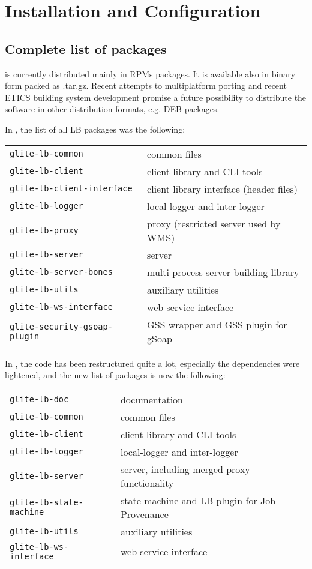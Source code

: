 \section{Installation and Configuration}

\subsection{Complete list of packages}

\LB is currently distributed mainly in RPMs packages. It is available also in
binary form packed as .tar.gz. Recent attempts to multiplatform porting and
recent ETICS building system development promise a future possibility to
distribute the software in other distribution formats, e.g. DEB packages. 

In \LBold, the list of all LB packages was the following:

\begin{tabularx}{\textwidth}{>{\tt}lX}
glite-lb-common & common files \\ 
glite-lb-client & client library and CLI tools\\ 
glite-lb-client-interface & client library interface (header files) \\ 
glite-lb-logger & local-logger and inter-logger \\ 
glite-lb-proxy & proxy (restricted server used by WMS)\\ 
glite-lb-server & server \\ 
glite-lb-server-bones & multi-process server building library \\ 
glite-lb-utils & auxiliary utilities \\ 
glite-lb-ws-interface & web service interface  \\
glite-security-gsoap-plugin & GSS wrapper and GSS plugin for gSoap
\end{tabularx}

In \LBnew, the code has been restructured quite a lot, especially the dependencies were lightened,
and the new list of packages is now the following:

\begin{tabularx}{\textwidth}{>{\tt}lX}
glite-lb-doc & documentation \\ 
glite-lb-common & common files \\ 
glite-lb-client & client library and CLI tools\\ 
glite-lb-logger & local-logger and inter-logger \\
glite-lb-server & server, including merged proxy functionality \\
glite-lb-state-machine & state machine and LB plugin for Job Provenance \\ 
glite-lb-utils & auxiliary utilities \\
glite-lb-ws-interface & web service interface \\
\end{tabularx}


